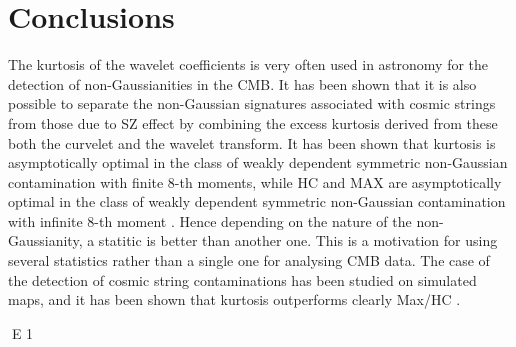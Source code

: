 \section{Conclusions}

The kurtosis of the wavelet coefficients is very often used in astronomy for the detection of non-Gaussianities in the CMB. It has been 
shown \citep{starck:sta03_1} that it is also possible to separate the non-Gaussian signatures associated with cosmic strings from those 
due to SZ effect by combining the excess kurtosis derived from these both the curvelet and the wavelet transform. It has been shown that 
kurtosis is asymptotically optimal in the class of weakly dependent symmetric non-Gaussian contamination with finite 8-th moments, while 
HC and MAX are asymptotically optimal in the class of weakly dependent symmetric non-Gaussian contamination with infinite 8-th moment \citep{starck:jin05}. 
Hence depending on the nature of the non-Gaussianity, a statitic is better than another one. This is a motivation for using several statistics 
rather than a single one for analysing CMB data. The case of the detection of cosmic string contaminations has been studied on simulated maps, 
and it has been shown that kurtosis outperforms clearly Max/HC \citep{starck:jin05}.  




E 1

